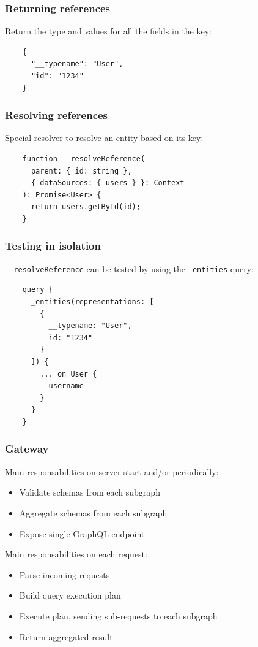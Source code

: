 \documentclass{beamer}
\begin{document}
\begin{frame}[fragile]
  \frametitle{Returning references}
  Return the type and values for all the fields in the key:
  \begin{verbatim}
    {
      "__typename": "User",
      "id": "1234"
    }
  \end{verbatim}
\end{frame}


\begin{frame}[fragile]
  \frametitle{Resolving references}
  Special resolver to resolve an entity based on its key:
  \begin{verbatim}
    function __resolveReference(
      parent: { id: string },
      { dataSources: { users } }: Context
    ): Promise<User> {
      return users.getById(id);
    }
  \end{verbatim}
\end{frame}


\begin{frame}[fragile]
  \frametitle{Testing in isolation}
  \texttt{\_\_resolveReference} can be tested by using the \texttt{\_entities} query:
  \begin{verbatim}
    query {
      _entities(representations: [
        {
          __typename: "User",
          id: "1234"
        }
      ]) {
        ... on User {
          username
        }
      }
    }
  \end{verbatim}
\end{frame}


\begin{frame}
  \frametitle{Gateway}

  Main responsabilities on server start and/or periodically:
  \begin{itemize}
  \item Validate schemas from each subgraph
  \item Aggregate schemas from each subgraph
  \item Expose single GraphQL endpoint
  \end{itemize}

  \vspace{1em}
  Main responsabilities on each request:
  \begin{itemize}
  \item Parse incoming requests
  \item Build query execution plan
  \item Execute plan, sending sub-requests to each subgraph
  \item Return aggregated result
  \end{itemize}
\end{frame}
\end{document}
